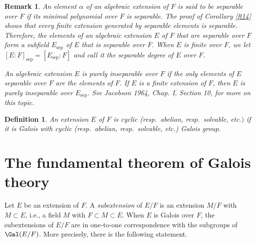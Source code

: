 \documentclass[a4paper,11pt,final,openany]{memoir}
\newtheorem{definition}[X]{Definition}
\newtheorem{remark}[X]{Remark}
\theoremstyle{nonumberplain}
\begin{document}
\begin{remark}
\label{ft16}An element $\alpha$ of an algebraic extension of $F$ is said to be
\emph{separable\/}%
over $F$ if its minimal polynomial over $F$ is separable. The proof of
Corollary \ref{ft14} shows that every finite extension generated by separable
elements is separable. Therefore, the elements of an algebraic extension $E$
of $F$ that are separable over $F$ form a subfield $E_{\text{sep}}$ of $E$
that is separable over $F$. When $E$ is finite over $F$, we let $[E\colon
F]_{\text{sep}}=[E_{\text{sep}}\colon F]$ and call it the \emph{separable
degree}%
%
\emph{\/} of $E$ over $F$.

An algebraic extension $E$ is \emph{purely inseparable} over $F$ if the only
elements of $E$ separable over $F$ are the elements of $F$. If $E$ is a finite
extension of $F$, then $E$ is purely inseparable over $E_{\mathrm{sep}}$. See
Jacobson 1964, Chap. I, Section 10, for more on this topic.
\end{remark}

\begin{definition}
\label{ft21}An extension $E$ of $F$ is
%
%
%
\emph{cyclic }(resp.\ \emph{abelian}, resp.\ \emph{solvable\/}, etc.$)$ if it
is Galois with cyclic (resp.\ abelian, resp.\ solvable, etc.) Galois group.
\end{definition}

\section{The fundamental theorem of Galois theory}

Let $E$ be an extension of $F$. A \emph{subextension} of $E/F$ is an extension
$M/F$ with $M\subset E$, i.e., a field $M$ with $F\subset M\subset E$. When
$E$ is Galois over $F$, the subextensions of $E/F$ are in one-to-one
correspondence with the subgroups of $\Gal(E/F)$. More precisely, there is the
following statement.
\end{document}
